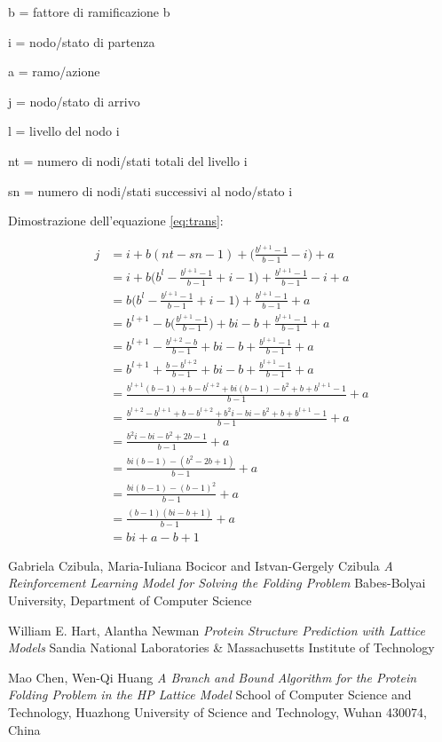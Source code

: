 \documentclass[conference]{IEEEtran}
\begin{document}
\appendix
\label{appendix:sviluppo}

b = fattore di ramificazione b

i = nodo/stato di partenza

a = ramo/azione

j = nodo/stato di arrivo

l = livello del nodo i

nt = numero di nodi/stati totali del livello i

sn = numero di nodi/stati successivi al nodo/stato i

Dimostrazione dell'equazione \ref{eq:trans}:

\begin{equation}
\begin{split}
j   & = i + b(nt - sn - 1) + \bigg(\frac{b^{l + 1} - 1}{b - 1} - i\bigg) + a\\
    & = i + b\bigg(b^{l} - \frac{b^{l + 1} - 1}{b - 1} + i - 1\bigg) + \frac{b^{l + 1} - 1}{b - 1} - i + a\\
    & = b\bigg(b^{l} - \frac{b^{l + 1} - 1}{b - 1} + i - 1\bigg) + \frac{b^{l + 1} - 1}{b - 1} + a\\
    & = b^{l + 1} - b\bigg(\frac{b^{l + 1} - 1}{b - 1}\bigg) + bi -b + \frac{b^{l + 1} - 1}{b - 1} + a\\
    & = b^{l + 1} - \frac{b^{l + 2} - b}{b - 1} + bi -b + \frac{b^{l + 1} - 1}{b - 1} + a\\
    & = b^{l + 1} + \frac{b - b^{l + 2}}{b - 1} + bi -b + \frac{b^{l + 1} - 1}{b - 1} + a\\
    & = \frac{b^{l + 1}(b - 1) + b - b^{l + 2} + bi(b - 1) -b^2 + b + b^{l + 1} - 1}{b - 1} + a\\
    & = \frac{b^{l + 2} - b^{l + 1} + b - b^{l + 2} + b^2i - bi -b^2 + b + b^{l + 1} - 1}{b - 1} + a\\
    & = \frac{b^2i - bi - b^2 + 2b - 1}{b - 1} + a\\
    & = \frac{bi(b - 1) - (b^2 - 2b + 1)}{b - 1} + a\\
    & = \frac{bi(b - 1) - (b - 1)^2}{b - 1} + a\\
    & = \frac{(b -1)(bi - b + 1)}{b-1} + a\\
    & = bi + a - b + 1
\end{split}
\end{equation}

\begin{thebibliography}{9}

  Gabriela Czibula, Maria-Iuliana Bocicor and Istvan-Gergely Czibula
  \textit{A Reinforcement Learning Model for Solving the Folding Problem}
  Babes-Bolyai University, Department of Computer Science

  William E. Hart, Alantha Newman
  \textit{Protein Structure Prediction with Lattice Models}
  Sandia National Laboratories \& Massachusetts Institute of Technology

  Mao Chen, Wen-Qi Huang
  \textit{A Branch and Bound Algorithm for the Protein Folding Problem in the
HP Lattice Model}
  School of Computer Science and Technology, Huazhong University of Science
and Technology, Wuhan 430074, China

\end{thebibliography}
\end{document}

